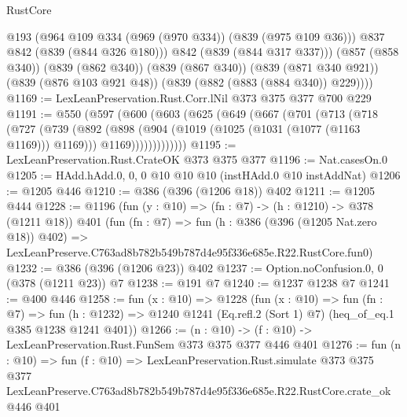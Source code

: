 \begin{lexlean}{RustCore}
\begin{coremodule}
            @193
            (@964 @109 @334 (@969 (@970 @334)) (@839 (@975 @109 @36)))
            @837
            @842
            (@839 (@844 @326 @180)))
          @842
          (@839 (@844 @317 @337)))
        (@857 (@858 @340))
        (@839 (@862 @340))
        (@839 (@867 @340))
        (@839 (@871 @340 @921))
        (@839 (@876 @103 @921 @48))
        (@839 (@882 (@883 (@884 @340)) @229))))
@1169 := LexLeanPreservation.Rust.Corr.lNil @373 @375 @377 @700 @229
@1191 := @550
    (@597
      (@600
        (@603
          (@625
            (@649
              (@667
                (@701
                  (@713
                    (@718
                      (@727
                        (@739
                          (@892
                            (@898
                              (@904 (@1019 (@1025 (@1031 (@1077 (@1163 @1169))) @1169)))
                              @1169)))))))))))))
@1195 := LexLeanPreservation.Rust.CrateOK @373 @375 @377
@1196 := Nat.casesOn.{0}
@1205 := HAdd.hAdd.{0, 0, 0} @10 @10 @10 (instHAdd.{0} @10 instAddNat)
@1206 := @1205 @446
@1210 := @386 (@396 (@1206 @18)) @402
@1211 := @1205 @444
@1228 := @1196
    (fun (y : @10) => (fn : @7) -> (h : @1210) -> @378 (@1211 @18))
    @401
    (fun (fn : @7) =>
    fun (h : @386 (@396 (@1205 Nat.zero @18)) @402) =>
    LexLeanPreserve.C763ad8b782b549b787d4e95f336e685e.R22.RustCore.fun0)
@1232 := @386 (@396 (@1206 @23)) @402
@1237 := Option.noConfusion.{0, 0} (@378 (@1211 @23)) @7
@1238 := @191 @7
@1240 := @1237 @1238 @7
@1241 := @400 @446
@1258 := fun (x : @10) =>
  @1228
    (fun (x : @10) =>
    fun (fn : @7) =>
    fun (h : @1232) => @1240 @1241 (Eq.refl.{2} (Sort 1) @7) (heq_of_eq.{1} @385 @1238 @1241 @401))
@1266 := (n : @10) -> (f : @10) -> LexLeanPreservation.Rust.FunSem @373 @375 @377 @446 @401
@1276 := fun (n : @10) =>
  fun (f : @10) =>
  LexLeanPreservation.Rust.simulate
    @373
    @375
    @377
    LexLeanPreserve.C763ad8b782b549b787d4e95f336e685e.R22.RustCore.crate_ok
    @446
    @401
\end{coremodule}
\end{lexlean}
